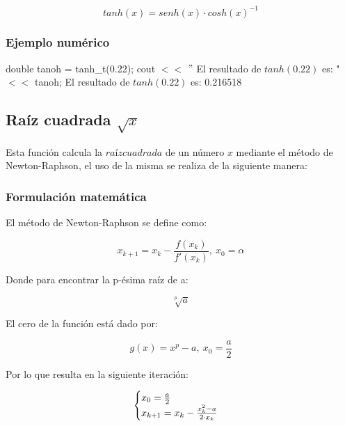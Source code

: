 \documentclass[10pt,a4paper]{article}
\begin{document}
	\begin{equation}\label{key18}
		tanh(x) = senh(x)\cdot cosh(x)^{-1}
	\end{equation}
	
	\subsubsection{Ejemplo numérico}

	double tanoh = tanh{\_}t(0.22); \newline
	cout $<<$ $"$ El resultado de $tanh(0.22)$ es: " $<<$ tanoh; \newline
	El resultado de $tanh(0.22)$ es: 0.216518\newline
	
	\subsection{Raíz cuadrada $\sqrt{x}$}
	
	Esta función calcula la $raíz cuadrada$ de un número $x$ mediante el método de Newton-Raphson, el uso de la misma se realiza de la siguiente manera:
	
	\begin{center}
	\end{center}
	
	\subsubsection{Formulación matemática}
	
	El método de Newton-Raphson se define como:
	
	\begin{equation}\label{key19}
		x_{k+1} = x_{k} - \frac{f(x_{k})}{f'(x_{k})}, ~x_{0} = \alpha
	\end{equation}
	
	Donde para encontrar la p-ésima raíz de a:
	
	\begin{equation}\label{key20}
		\sqrt[p]{a}	
	\end{equation}

	El cero de la función está dado por:
	
	\begin{equation}\label{key21}
		g(x) = x^{p} - a, ~x_{0} = \frac{a}{2}
	\end{equation}

	Por lo que resulta en la siguiente iteración:
	
	\begin{align*}
		\centering
		\begin{cases}
			x_{0} = \frac{a}{2} \\
			x_{k+1} = x_{k} - \frac{x_{k}^{2} - a}{2\cdot x_{k}}
		\end{cases}
	\end{align*}
	
\end{document}
